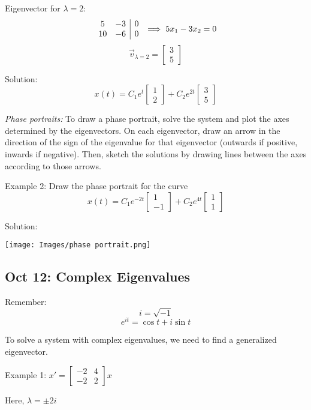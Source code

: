 \documentclass[12pt]{article}
\begin{document}
Eigenvector for $\lambda = 2$:
\[\begin{array}{c c | c}
    5 & -3 & 0\\
    10 & -6 & 0
\end{array} \implies 5x_1 - 3x_2 = 0\]
\[\vec{v}_{\lambda = 2} = \begin{bmatrix}
    3\\
    5
\end{bmatrix}\]

Solution:
\[\boxed{x(t) = C_1 e^{t} \begin{bmatrix}
    1\\2
\end{bmatrix} + C_2 e^{2t} \begin{bmatrix}
    3\\5
\end{bmatrix}}\]

\emph{Phase portraits:}
To draw a phase portrait, solve the system and plot the axes determined by the eigenvectors. On each eigenvector, draw an arrow in the direction of the sign of the eigenvalue for that eigenvector (outwards if positive, inwards if negative). Then, sketch the solutions by drawing lines between the axes according to those arrows.

Example 2: Draw the phase portrait for the curve 
\[x(t) = C_1 e^{-2t} \begin{bmatrix}
    1\\-1
\end{bmatrix}+ C_2 e^{4t} \begin{bmatrix}
    1\\1
\end{bmatrix}\]

Solution:

\texttt{[image: Images/phase portrait.png]}

\subsection*{Oct 12: Complex Eigenvalues}
Remember:
\[i = \sqrt{-1}\]
\[e^{it} = \cos t + i \sin t\]

To solve a system with complex eigenvalues, we need to find a generalized eigenvector. 

Example 1: $x' = \begin{bmatrix}
    -2 & 4\\
    -2 & 2
\end{bmatrix} x$

Here, $\lambda = \pm 2i$
\end{document}
